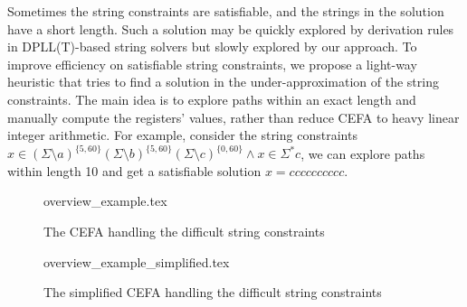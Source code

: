 Sometimes the string constraints are satisfiable, and the strings in the solution have a short length. Such a solution may be quickly explored by derivation rules in DPLL(T)-based string solvers but slowly explored by our approach. To improve efficiency on satisfiable string constraints, we propose a light-way heuristic that tries to find a solution in the under-approximation of the string constraints. The main idea is to explore paths within an exact length and manually compute the registers' values, rather than reduce CEFA to heavy linear integer arithmetic. For example, consider the string constraints $x \in (\Sigma \setminus a)^{\{5, 60\}} (\Sigma \setminus b)^{\{5, 60\}} (\Sigma \setminus c)^{\{0, 60\}} \wedge x \in \Sigma^* c$, we can explore paths within length 10 and get a satisfiable solution $x = cccccccccc$. 
\begin{figure}[ht]
  \centering
  {overview_example.tex}
  \caption{The CEFA handling the difficult string constraints}
  \label{fig:overview:orgin}
\end{figure}
\begin{figure}[ht]
  \centering
  {overview_example_simplified.tex}
  \caption{The simplified CEFA handling the difficult string constraints}
  \label{fig:overview:simplified}
\end{figure}

